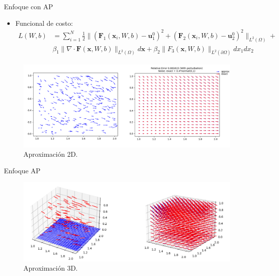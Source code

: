 \documentclass[aspectratio=1610]{beamer}
\begin{document}
\begin{frame} {Enfoque con AP}
  \begin{itemize}
  \item   Funcional de costo:
    \begin{align*}
      L(W,b) &= \sum_{i=1}^N \frac{1}{2}\| (\mathbf{F}_1(\mathbf{x}_i,W,b) - \mathbf{u}_1^0)^2 + (\mathbf{F}_2(\mathbf{x}_i,W,b) - \mathbf{u}_2^0)^2\|_{L^2(\Omega)} +\\
      &\beta_1 \|\nabla \cdot \mathbf{F}(\mathbf{x},W,b) \|_{L^2(\Omega)} d\mathbf{x} +
      \beta_2 \| F_3(\mathbf{x},W,b)\|_{L^2( {\partial \Omega} )} dx_1 dx_2
    \end{align*}

  \end{itemize}


  \begin{figure}[h]
    \centering
    \includegraphics[scale=0.25]{fig10}
    \caption{Aproximaci\'on 2D. }
  \end{figure}

\end{frame}



\begin{frame} {Enfoque AP}
    \begin{figure}[h]
    \centering
    \includegraphics[scale=0.4]{fig11}
    \caption{Aproximaci\'on 3D. }
  \end{figure}
\end{frame}
\end{document}
